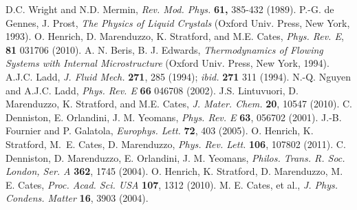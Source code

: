 \documentclass[12pt,twoside]{article}
\begin{document}
\begin{thebibliography}{99}

D.C. Wright and N.D. Mermin,
{\it Rev. Mod. Phys.} {\bf 61,} 385-432 (1989).
P.-G. de Gennes, J. Prost,
{\it The Physics of Liquid Crystals} (Oxford Univ. Press, New York, 1993).
O. Henrich, D. Marenduzzo, K. Stratford, and M.E. Cates,
\textit{Phys. Rev. E}, \textbf{81} 031706 (2010).
A. N. Beris, B. J. Edwards, 
{\it Thermodynamics of Flowing Systems with Internal Microstructure}
(Oxford Univ. Press, New York, 1994).
A.J.C. Ladd,
\textit{J. Fluid Mech.} \textbf{271}, 285 (1994); \textit{ibid.} \textbf{271}
311 (1994).
N.-Q. Nguyen and A.J.C. Ladd,
\textit{Phys. Rev. E} \textbf{66} 046708 (2002).
J.S. Lintuvuori, D. Marenduzzo, K. Stratford, and M.E. Cates,
\textit{J. Mater. Chem.} \textbf{20}, 10547 (2010).
C. Denniston, E. Orlandini, J. M. Yeomans, 
\textit{Phys. Rev. E} \textbf{63}, 056702 (2001).
J.-B. Fournier and P. Galatola,
\textit{Europhys. Lett.} \textbf{72}, 403 (2005).
O. Henrich, K. Stratford, M.~E. Cates, D. Marenduzzo,
{\it Phys. Rev. Lett.} {\bf 106}, 107802 (2011).
C. Denniston, D. Marenduzzo, E. Orlandini, J. M.  Yeomans, 
\textit{Philos. Trans. R. Soc. London, Ser. A} \textbf{362}, 1745 (2004).
O. Henrich, K. Stratford, D. Marenduzzo, M. E. Cates, 
\textit{Proc. Acad. Sci. USA} \textbf{107}, 1312 (2010).
 M. E. Cates,  et al., 
\textit{J. Phys. Condens. Matter} \textbf{16},  3903 (2004). 


\end{thebibliography}
\end{document}
